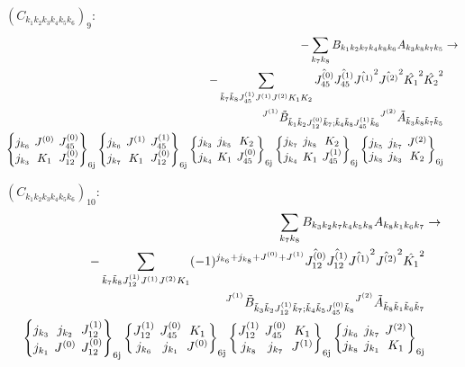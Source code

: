 \documentclass[11pt]{article}
\newcommand{\sixj}[6]{\begingroup\setlength{\arraycolsep}{0.2em}\begin{Bmatrix} #1 & #2 & #3 \\ #4 & #5 & #6 \end{Bmatrix}_{\text{6j}}\endgroup}
\begin{document}
$\left({C}_{{k}_{1}{k}_{2}{k}_{3}{k}_{4}{k}_{5}{k}_{6}}\right)_{9}$:
\begin{align}
-\sum_{{k}_{7}{k}_{8}}{B}_{{k}_{1}{k}_{2}{k}_{7}{k}_{4}{k}_{8}{k}_{6}}{A}_{{k}_{3}{k}_{8}{k}_{7}{k}_{5}}&\rightarrow \notag \\-\sum_{\tilde{k}_{7}\tilde{k}_{8}J^{(1)}_{45}J^{(1)}J^{(2)}K_{1}K_{2}}\hat{J^{(0)}_{45}}\hat{J^{(1)}_{45}}\hat{J^{(1)}}^{2}\hat{J^{(2)}}^{2}\hat{K_{1}}^{2}\hat{K_{2}}^{2}& \notag \\{}^{J^{(1)}}\tilde{B}_{\tilde{k}_{1}\tilde{k}_{2}J^{(0)}_{12}\tilde{k}_{7};\tilde{k}_{4}\tilde{k}_{8}J^{(1)}_{45}\tilde{k}_{6}}{}^{J^{(2)}}\tilde{A}_{\tilde{k}_{3}\tilde{k}_{8}\tilde{k}_{7}\tilde{k}_{5}}& \notag \\\sixj{j_{{k}_{6}}}{J^{(0)}}{J^{(0)}_{45}}{j_{{k}_{3}}}{K_{1}}{J^{(0)}_{12}}\sixj{j_{{k}_{6}}}{J^{(1)}}{J^{(1)}_{45}}{j_{{k}_{7}}}{K_{1}}{J^{(0)}_{12}}\sixj{j_{{k}_{3}}}{j_{{k}_{5}}}{K_{2}}{j_{{k}_{4}}}{K_{1}}{J^{(0)}_{45}}\sixj{j_{{k}_{7}}}{j_{{k}_{8}}}{K_{2}}{j_{{k}_{4}}}{K_{1}}{J^{(1)}_{45}}\sixj{j_{{k}_{5}}}{j_{{k}_{7}}}{J^{(2)}}{j_{{k}_{8}}}{j_{{k}_{3}}}{K_{2}}
\end{align}

$\left({C}_{{k}_{1}{k}_{2}{k}_{3}{k}_{4}{k}_{5}{k}_{6}}\right)_{10}$:
\begin{align}
\sum_{{k}_{7}{k}_{8}}{B}_{{k}_{3}{k}_{2}{k}_{7}{k}_{4}{k}_{5}{k}_{8}}{A}_{{k}_{8}{k}_{1}{k}_{6}{k}_{7}}&\rightarrow \notag \\-\sum_{\tilde{k}_{7}\tilde{k}_{8}J^{(1)}_{12}J^{(1)}J^{(2)}K_{1}}(-1)^{j_{{k}_{6}} +j_{{k}_{8}} +J^{(0)} +J^{(1)} }\hat{J^{(0)}_{12}}\hat{J^{(1)}_{12}}\hat{J^{(1)}}^{2}\hat{J^{(2)}}^{2}\hat{K_{1}}^{2}& \notag \\{}^{J^{(1)}}\tilde{B}_{\tilde{k}_{3}\tilde{k}_{2}J^{(1)}_{12}\tilde{k}_{7};\tilde{k}_{4}\tilde{k}_{5}J^{(0)}_{45}\tilde{k}_{8}}{}^{J^{(2)}}\tilde{A}_{\tilde{k}_{8}\tilde{k}_{1}\tilde{k}_{6}\tilde{k}_{7}}& \notag \\\sixj{j_{{k}_{3}}}{j_{{k}_{2}}}{J^{(1)}_{12}}{j_{{k}_{1}}}{J^{(0)}}{J^{(0)}_{12}}\sixj{J^{(1)}_{12}}{J^{(0)}_{45}}{K_{1}}{j_{{k}_{6}}}{j_{{k}_{1}}}{J^{(0)}}\sixj{J^{(1)}_{12}}{J^{(0)}_{45}}{K_{1}}{j_{{k}_{8}}}{j_{{k}_{7}}}{J^{(1)}}\sixj{j_{{k}_{6}}}{j_{{k}_{7}}}{J^{(2)}}{j_{{k}_{8}}}{j_{{k}_{1}}}{K_{1}}
\end{align}
\end{document}
